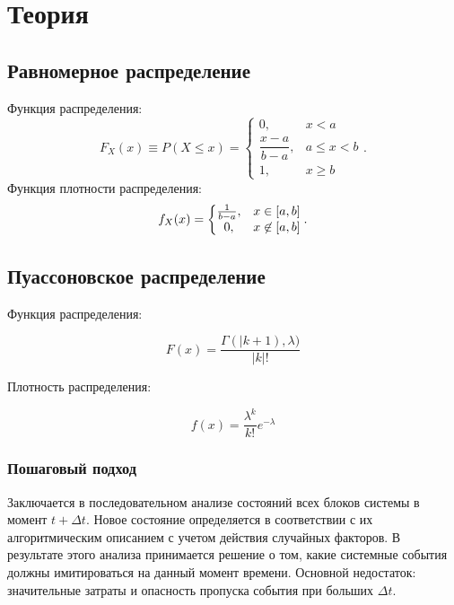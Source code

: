 \documentclass[14pt, a4paper]{extarticle}
\begin{document}
\section*{Теория}
\subsection*{Равномерное распределение}
Функция распределения:
\begin{equation*}
	F_X(x) \equiv P(X \le x) = \left\{
	\begin{matrix}
		0, & x < a \\
		\dfrac{x-a}{b-a}, & a \le x < b \\
		1, & x \ge b
	\end{matrix}
	\right..
\end{equation*}
Функция плотности распределения:
\begin{equation*}
	f_X(x) = \left\{
	\begin{matrix}
		{1 \over b-a}, & x\in [a,b] \\
		0, & x\not\in [a,b]
	\end{matrix}
	\right..
\end{equation*}

\subsection*{Пуассоновское распределение}
Функция распределения:

\begin{equation*}
	F(x) =  \frac{\Gamma(|k + 1), \lambda)}{|k|!}
\end{equation*}

Плотность распределения:

\begin{equation*}
	f(x) = \frac{\lambda^{k}}{k!} e^{-\lambda} 
\end{equation*}	
\newpage

\subsubsection*{Пошаговый подход}
Заключается в последовательном анализе состояний всех блоков системы в момент $t + \Delta t$. Новое состояние определяется в соответствии с их алгоритмическим описанием с учетом действия случайных факторов. В результате этого анализа принимается решение о том, какие системные события должны имитироваться на данный момент времени. Основной недостаток: значительные затраты и опасность пропуска события при больших $\Delta t$.
\end{document}
